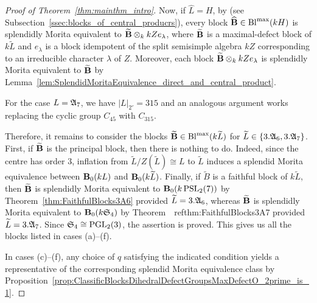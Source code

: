 \begin{proof}[Proof of Theorem~\ref{thm:mainthm_intro}]
Now, if $\widehat{L}=H$, 
by \cite[Proposition~1.5]{Duvel04} (see Subsection~\ref{ssec:blocks_of_central_producrs}), every block $\widehat{{\mathbf{B}}}\in\operatorname{Bl}^{\mathrm{max}}(kH)$ is splendidly Morita equivalent to  $\widetilde{{\mathbf{B}}}\otimes_k kZe_\lambda$, where $\widetilde{{\mathbf{B}}}$ is a
maximal-defect block of $k\widetilde{L}$ and $e_\lambda$ is a block idempotent of
the split semisimple algebra $kZ$ corresponding to an irreducible character
$\lambda$ of $Z$.  Moreover, each block
$\widetilde{{\mathbf{B}}}\otimes_k kZe_\lambda$ is splendidly Morita equivalent to
$\widetilde{{\mathbf{B}}}$ by Lemma~\ref{lem:SplendidMoritaEquivalence_direct_and_central_product}.
\par
For the case $L={\mathfrak{A}}_7$, we have $|L|_{2'}=315$ and  an analogous  argument works replacing the cyclic group $C_{45}$ with $C_{315}$.
\par 
Therefore, it remains to consider the blocks $\widetilde{{\mathbf{B}}}\in \operatorname{Bl}^{\textrm{max}}(k\widetilde{L})$ for $\widetilde{L}\in\{3.{\mathfrak{A}}_6,3.{\mathfrak{A}}_7\}$. First, if $\widetilde{{\mathbf{B}}}$ is the principal block, then there is nothing to do. Indeed, since the centre has order $3$, inflation from $\widetilde{L}/Z(\widetilde{L})\cong L$ to  $\widetilde{L}$ induces a splendid Morita equivalence between 
${\mathbf{B}}_0(kL)$ and ${\mathbf{B}}_0(k\widetilde{L})$.
Finally, if $\widetilde{B}$ is a faithful block of $k\widetilde{L}$, then $\widetilde{{\mathbf{B}}}$ is splendidly Morita equivalent to ${\mathbf{B}}_0(k\operatorname{PSL}_2(7))$ by Theorem~\ref{thm:FaithfulBlocks3A6} provided $\widetilde{L}=3.{\mathfrak{A}}_6$, whereas $\widetilde{{\mathbf{B}}}$ is splendidly Morita equivalent to ${\mathbf{B}}_0(k{\mathfrak{S}}_4)$ by Theorem~\ ref{thm:FaithfulBlocks3A7} provided $\widetilde{L}=3.{\mathfrak{A}}_7$. Since ${\mathfrak{S}}_4\cong\operatorname{PGL}_2(3)$, the assertion is proved.
This gives us all the blocks listed in cases {\rm(a)--(f)}.
\par
In cases {\rm(c)--(f)}, any choice of $q$ satisfying the indicated condition yields a representative of the corresponding splendid Morita equivalence class by Proposition~\ref{prop:ClassificBlocksDihedralDefectGroupsMaxDefectO_2prime_is_1}. 
\end{proof}
